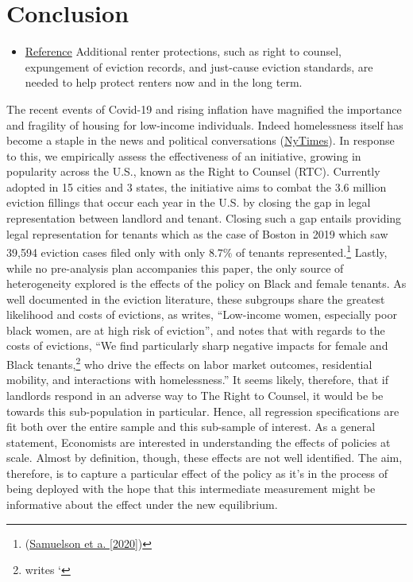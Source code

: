 \documentclass[a4paper,12pt]{article}
\begin{document}
\section{Conclusion}
\begin{itemize}
    \item \href{https://nlihc.org/sites/default/files/Overview-of-National-Eviction-Moratorium.pdf}{Reference} Additional renter protections, such as right to counsel, expungement of eviction records, and just-cause
eviction standards, are needed to help protect renters now and in the long term.
\end{itemize}
The recent events of Covid-19 and rising inflation have magnified the importance and fragility of housing for low-income individuals. Indeed homelessness itself has become a staple in the news and political conversations (\href{https://www.nytimes.com/2022/10/31/opinion/oregon-governor-race.html}{NyTimes}). In response to this, we empirically assess the effectiveness of an initiative, growing in popularity across the U.S., known as the Right to Counsel (RTC). Currently adopted in 15 cities and 3 states, the initiative aims to combat the 3.6 million eviction fillings that occur each year in the U.S. by closing the gap in legal representation between landlord and tenant. Closing such a gap entails providing legal representation for tenants which as the case of Boston in 2019 which saw 39,594 eviction cases filed only  with only $8.7\%$ of tenants represented.\footnote{(\href{https://bostonbar.org/app/uploads/2022/06/rtc-report-for-web-or-email.pdf}{Samuelson et a. [2020]})}
Lastly, while no pre-analysis plan accompanies this paper, the only source of heterogeneity explored is the effects of the policy on Black and female tenants. As well documented in the eviction literature, these subgroups share the greatest likelihood and costs of evictions, as \cite{desmond2019unaffordable} writes, ``Low-income women, especially poor black women, are at high risk of eviction'', and \cite{collinson2022eviction} notes that with regards to the costs of evictions, ``We find particularly sharp negative impacts for female and Black tenants,\footnote{\cite{evans2019reducing} writes `} who drive the effects on labor market outcomes, residential mobility, and interactions with homelessness.'' It seems likely, therefore, that if landlords respond in an adverse way to The Right to Counsel, it would be be towards this sub-population in particular. Hence, all regression specifications are fit both over the entire sample and this sub-sample of interest. 
As a general statement, Economists are interested in understanding the effects of policies at scale. Almost by definition, though, these effects are not well identified. The aim, therefore, is to capture a particular effect of the policy as it's in the process of being deployed with the hope that this intermediate measurement might be informative about the effect under the new equilibrium.\par 
\end{document}
